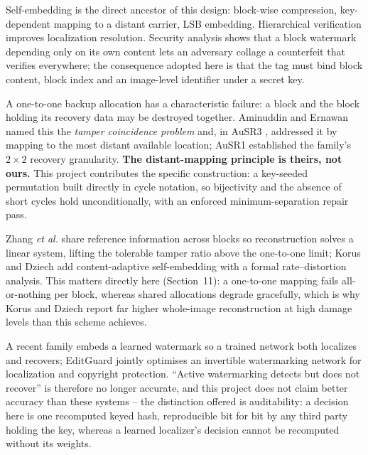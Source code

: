 \documentclass[12pt,a4paper]{article}
\begin{document}
Self-embedding \cite{fridrich1999selfembedding} is the direct ancestor of this
design: block-wise compression, key-dependent mapping to a distant carrier,
LSB embedding. Hierarchical verification \cite{lin2005hierarchical} improves
localization resolution. Security analysis \cite{holliman2000counterfeiting,
fridrich2002security} shows that a block watermark depending only on its own
content lets an adversary collage a counterfeit that verifies everywhere; the
consequence adopted here is that the tag must bind block content, block index
and an image-level identifier under a secret key.

A one-to-one backup allocation has a characteristic failure: a block and the
block holding its recovery data may be destroyed together. Aminuddin and
Ernawan named this the \emph{tamper coincidence problem} and, in AuSR3
\cite{ausr3}, addressed it by mapping to the most distant available location;
AuSR1 \cite{ausr1} established the family's $2\times2$ recovery granularity.
\textbf{The distant-mapping principle is theirs, not ours.} This project
contributes the specific construction: a key-seeded permutation built directly
in cycle notation, so bijectivity and the absence of short cycles hold
unconditionally, with an enforced minimum-separation repair pass.

Zhang \emph{et al.} \cite{zhang2011reference} share reference information
across blocks so reconstruction solves a linear system, lifting the tolerable
tamper ratio above the one-to-one limit; Korus and Dziech
\cite{korus2013efficient} add content-adaptive self-embedding with a formal
rate--distortion analysis. This matters directly here (Section~11): a
one-to-one mapping fails all-or-nothing per block, whereas shared allocations
degrade gracefully, which is why Korus and Dziech report far higher
whole-image reconstruction at high damage levels than this scheme achieves.

A recent family embeds a learned watermark so a trained network both
localizes and recovers; EditGuard \cite{editguard} jointly optimises an
invertible watermarking network for localization and copyright protection.
``Active watermarking detects but does not recover'' is therefore no longer
accurate, and this project does not claim better accuracy than these systems
-- the distinction offered is auditability: a decision here is one recomputed
keyed hash, reproducible bit for bit by any third party holding the key,
whereas a learned localizer's decision cannot be recomputed without its
weights.
\end{document}
